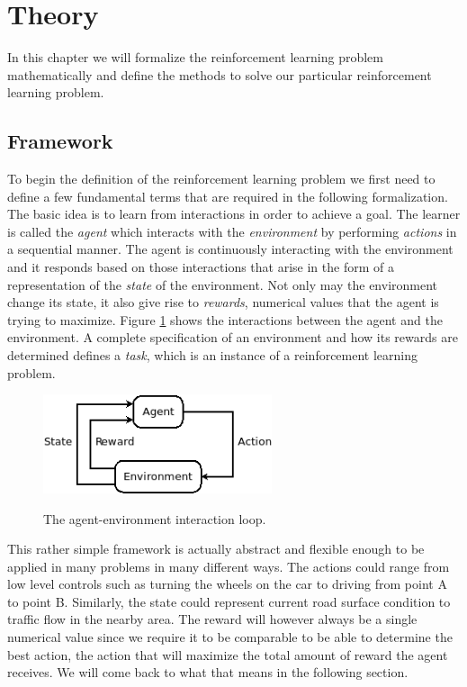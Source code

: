 \documentclass[result.tex]{subfiles}
\begin{document}
    \section*{\centering Theory}

    In this chapter we will formalize the reinforcement learning problem mathematically and define the methods to solve our particular reinforcement learning problem.

    \subsection*{Framework}

    To begin the definition of the reinforcement learning problem we first need to define a few fundamental terms that are required in the following formalization. The basic idea is to learn from interactions in order to achieve a goal. The learner is called the \textit{agent} which interacts with the \textit{environment} by performing \textit{actions} in a sequential manner. The agent is continuously interacting with the environment and it responds based on those interactions that arise in the form of a representation of the \textit{state} of the environment. Not only may the environment change its state, it also give rise to \textit{rewards}, numerical values that the agent is trying to maximize. Figure \ref{fig:agent_env} shows the interactions between the agent and the environment. A complete specification of an environment and how its rewards are determined defines a \textit{task}, which is an instance of a reinforcement learning problem.

    \begin{figure}[H]
        \centering
        \includegraphics[width=0.6\textwidth]{./images/agent_env}
        \label{fig:agent_env}
        \caption{The agent-environment interaction loop.}
    \end{figure}

    This rather simple framework is actually abstract and flexible enough to be applied in many problems in many different ways. The actions could range from low level controls such as turning the wheels on the car to driving from point A to point B. Similarly, the state could represent current road surface condition to traffic flow in the nearby area. The reward will however always be a single numerical value since we require it to be comparable to be able to determine the best action, the action that will maximize the total amount of reward the agent receives. We will come back to what that means in the following section.
\end{document}
